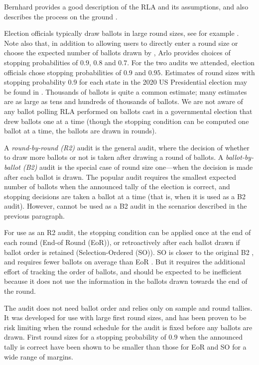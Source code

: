  Bernhard provides a good description of the RLA and its assumptions, and also describes the process on the ground \cite{bernhard-sok}. 

Election officials typically draw ballots in large round sizes, see for example \cite{va-2022,RI-report}. Note also that, in addition to allowing users to directly enter a round size or choose the expected number of ballots drawn by \BRAVO, Arlo provides choices of stopping probabilities of $0.9$, $0.8$ and $0.7$. For the two audits we attended, election officials chose stopping probabilities of $0.9$ and $0.95$. Estimates of round sizes with stopping probability 0.9 for each state in the 2020 US Presidential election may be found in \cite{usenix_minerva}. Thousands of ballots is quite a common estimate; many estimates are as large as tens and hundreds of thousands of ballots. We are not aware of any ballot polling RLA performed on ballots cast in a governmental election that drew ballots one at a time (though the stopping condition can be computed one ballot at a time, the ballots are drawn in rounds). 

 A {\em round-by-round (R2)} audit is the general audit, where the decision of whether to draw more ballots or not is taken after drawing a round of ballots. A {\em ballot-by-ballot (B2)} audit is the special case of round size one---when the decision is made after each ballot is drawn. The popular \BRAVO audit \cite{bravo} requires the smallest expected number of ballots when the announced tally of the election is correct, and stopping decisions are taken a ballot at a time (that is, when it is used as a B2 audit). However, \BRAVO cannot be used as a B2 audit in the scenarios described in the previous paragraph. 

For use as an R2 audit, the \BRAVO stopping condition can be applied once at the end of each round (End-of Round (EoR)), or retroactively after each ballot drawn if ballot order is retained (Selection-Ordered (SO)). SO \BRAVO is closer to the original B2 \BRAVO, and requires fewer ballots on average than EoR \BRAVO. But it requires the additional effort of tracking the order of ballots, and should be expected to be inefficient because it does not use the information in the ballots drawn towards the end of the round. 

 The \Minerva audit \cite{usenix_minerva,arxiv_athena} does not need ballot order and relies only on sample and round tallies. It was developed for use with large first round sizes, and has been proven to be risk limiting when the round schedule for the audit is fixed before any ballots are drawn. First round sizes for a stopping probability of $0.9$ when the announced tally is correct have been shown to be smaller than those for EoR and SO \BRAVO for a wide range of margins. 

